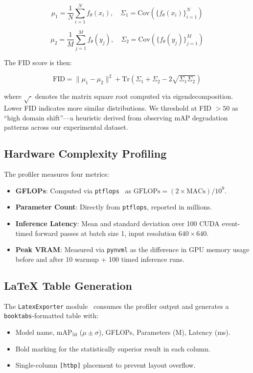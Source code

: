 \documentclass[10pt,twocolumn,letterpaper]{article}
\begin{document}
\begin{equation}
    \mu_1 = \frac{1}{N} \sum_{i=1}^{N} f_\theta(x_i), \quad
    \Sigma_1 = \text{Cov}\left(\{f_\theta(x_i)\}_{i=1}^{N}\right)
\end{equation}

\begin{equation}
    \mu_2 = \frac{1}{M} \sum_{j=1}^{M} f_\theta(y_j), \quad
    \Sigma_2 = \text{Cov}\left(\{f_\theta(y_j)\}_{j=1}^{M}\right)
\end{equation}

The FID score is then:

\begin{equation}
    \text{FID} = \|\mu_1 - \mu_2\|^2 + \text{Tr}\left(\Sigma_1 + \Sigma_2 - 2\sqrt{\Sigma_1 \Sigma_2}\right)
\end{equation}

where $\sqrt{\cdot}$ denotes the matrix square root computed via eigendecomposition. Lower FID indicates more similar distributions. We threshold at FID $> 50$ as ``high domain shift''---a heuristic derived from observing mAP degradation patterns across our experimental dataset.

\subsection{Hardware Complexity Profiling}
The profiler measures four metrics:

\begin{itemize}
    \item \textbf{GFLOPs}: Computed via \texttt{ptflops}~\cite{ptflops} as $\text{GFLOPs} = (2 \times \text{MACs}) / 10^9$.
    \item \textbf{Parameter Count}: Directly from \texttt{ptflops}, reported in millions.
    \item \textbf{Inference Latency}: Mean and standard deviation over 100 CUDA event-timed forward passes at batch size 1, input resolution $640 \times 640$.
    \item \textbf{Peak VRAM}: Measured via \texttt{pynvml} as the difference in GPU memory usage before and after 10 warmup + 100 timed inference runs.
\end{itemize}

\subsection{LaTeX Table Generation}
The \texttt{LatexExporter} module~\cite{calsaverini2020guidelines} consumes the profiler output and generates a \texttt{booktabs}-formatted table with:
\begin{itemize}
    \item Model name, mAP$_{50}$ ($\mu \pm \sigma$), GFLOPs, Parameters (M), Latency (ms).
    \item Bold marking for the statistically superior result in each column.
    \item Single-column \texttt{[htbp]} placement to prevent layout overflow.
\end{itemize}
\end{document}
